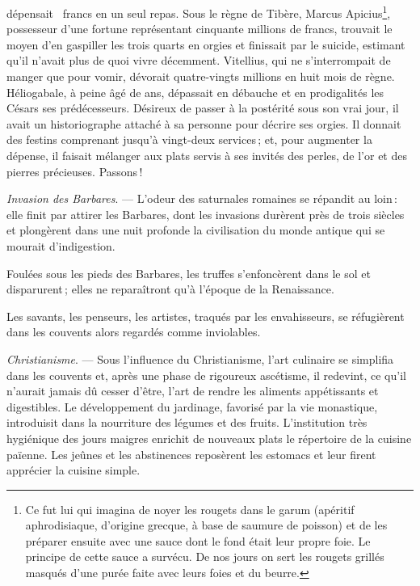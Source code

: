 dépensait {\mmm} {\mmm} francs en un seul repas. Sous le règne de
Tibère, Marcus Apicius\footnote{Ce fut lui qui imagina de noyer les rougets
dans le garum (apéritif aphrodisiaque, d'origine grecque, à base de saumure de
poisson) et de les préparer ensuite avec une sauce dont le fond était leur
propre foie. Le principe de cette sauce a survécu. De nos jours on sert les
rougets grillés masqués d'une purée faite avec leurs foies et du beurre.},
possesseur d'une fortune représentant cinquante millions de francs, trouvait le
moyen d'en gaspiller les trois quarts en orgies et finissait par le suicide,
estimant qu'il n'avait plus de quoi vivre décemment. Vitellius, qui ne
s'interrompait de manger que pour vomir, dévorait quatre-vingts millions en
huit mois de règne. Héliogabale, à peine âgé de {\mmm} ans, dépassait en
débauche et en prodigalités les Césars ses prédécesseurs. Désireux de passer
à la postérité sous son vrai jour, il avait un historiographe attaché à sa
personne pour décrire ses orgies. Il donnait des festins comprenant jusqu'à
vingt-deux services ; et, pour augmenter la dépense, il faisait mélanger aux
plats servis à ses invités des perles, de l'or et des pierres précieuses.
Passons !

\sk

\textit{Invasion des Barbares}. — L'odeur des saturnales romaines se répandit
au loin : elle finit par attirer les Barbares, dont les invasions durèrent près
de trois siècles et plongèrent dans une nuit profonde la civilisation du monde
antique qui se mourait d'indigestion.

Foulées sous les pieds des Barbares, les truffes s'enfoncèrent dans le sol et
disparurent ; elles ne reparaîtront qu'à l’époque de la Renaissance.

Les savants, les penseurs, les artistes, traqués par les envahisseurs, se réfugièrent
dans les couvents alors regardés comme inviolables.

\sk

\textit{Christianisme}. — Sous l'influence du Christianisme, l’art culinaire se
simplifia dans les couvents et, après une phase de rigoureux ascétisme, il
redevint, ce qu'il n'aurait jamais dû cesser d'être, l'art de rendre les
aliments appétissants et digestibles. Le développement du jardinage, favorisé
par la vie monastique, introduisit dans la nourriture des légumes et des
fruits. L'institution très hygiénique des jours maigres enrichit de nouveaux
plats le répertoire de la cuisine païenne. Les jeûnes et les abstinences
reposèrent les estomacs et leur firent apprécier la cuisine simple.

